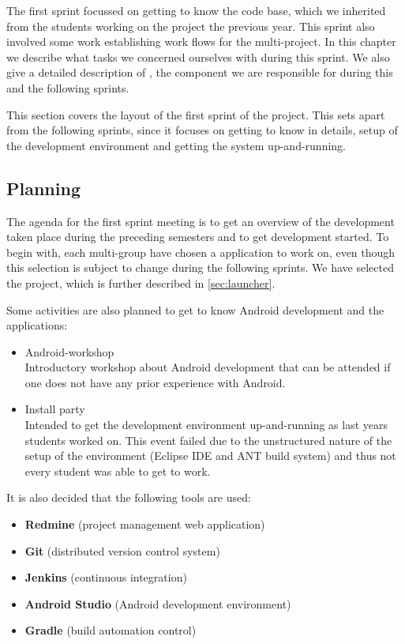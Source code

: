 The first sprint focussed on getting to know the \giraf code base, which we inherited from the students working on the project the previous year. 
This sprint also involved some work establishing work flows for the multi-project. 
In this chapter we describe what tasks we concerned ourselves with during this sprint. 
We also give a detailed description of \launcher, the component we are responsible for during this and the following sprints.

This section covers the layout of the first sprint of the project.
This sets apart from the following sprints, since it focuses on getting to know \giraf in details, setup of the development environment and getting the system up-and-running.

\subsection{Planning}\label{sec:sprint1:planning}
The agenda for the first sprint meeting is to get an overview of the development taken place during the preceding semesters and to get development started.
To begin with, each multi-group have chosen a \giraf application to work on, even though this selection is subject to change during the following sprints.
We have selected the \launcher project, which is further described in \cref{sec:launcher}.

Some activities are also planned to get to know Android development and the \giraf applications:

\begin{itemize}
\item Android-workshop\\
Introductory workshop about Android development that can be attended if one does not have any prior experience with Android.
\item Install party\\
Intended to get the \giraf development environment up-and-running as last years students worked on. 
This event failed due to the unstructured nature of the setup of the environment (Eclipse IDE and ANT build system) and thus not every student was able to get \giraf to work.
\end{itemize}

It is also decided that the following tools are used:

\begin{itemize}
\item \textbf{Redmine} (project management web application)
\item \textbf{Git} (distributed version control system)
\item \textbf{Jenkins} (continuous integration)
\item \textbf{Android Studio} (Android development environment)
\item \textbf{Gradle} (build automation control)
\end{itemize}

